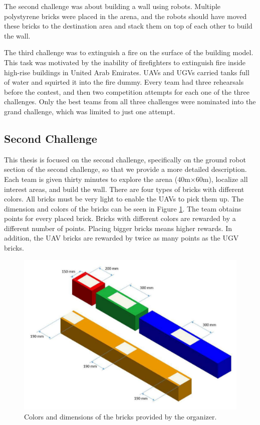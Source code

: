 The second challenge was about building a wall using robots. Multiple polystyrene bricks were placed in the arena, and the robots should have moved these bricks to the destination area and stack them on top of each other to build the wall. 

The third challenge was to extinguish a fire on the surface of the building model. This task was motivated by the inability of firefighters to extinguish fire inside high-rise buildings in United Arab Emirates. UAVs and UGVs carried tanks full of water and squirted it into the fire dummy. Every team had three rehearsals before the contest, and then two competition attempts for each one of the three challenges. Only the best teams from all three challenges were nominated into the grand challenge, which was limited to just one attempt.

\subsection{Second Challenge}
This thesis is focused on the second challenge, specifically on the ground robot section of the second challenge, so that we provide a more detailed description. Each team is given thirty minutes to explore the arena ($40$m$\times 60$m), localize all interest areas, and build the wall. There are four types of bricks with different colors. All bricks must be very light to enable the UAVs to pick them up. The dimension and colors of the bricks can be seen in Figure \ref{fig:brickdef}. The team obtains points for every placed brick. Bricks with different colors are rewarded by a different number of points. Placing bigger bricks means higher rewards. In addition, the UAV bricks are rewarded by twice as many points as the UGV bricks.

\begin{figure}[H]

\centering
\includegraphics[scale=0.33]{fig/brick_sample.png}
\caption[Bricks definition]{Colors and dimensions of the bricks provided by the organizer.}
\label{fig:brickdef}

\end{figure}

